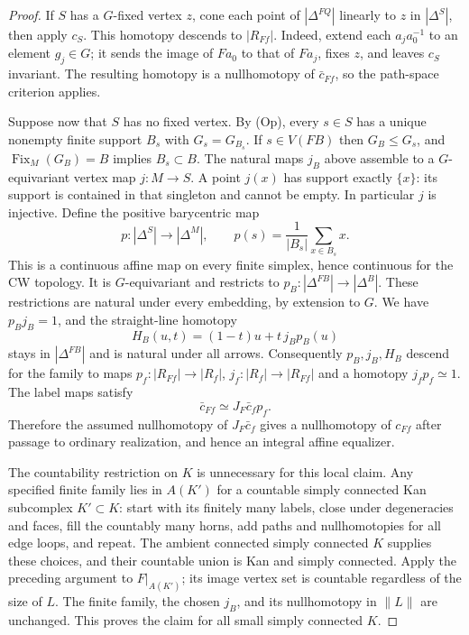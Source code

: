 \begin{proof}
If $S$ has a $G$-fixed vertex $z$, cone each point of
$|\Delta^{FQ}|$ linearly to $z$ in $|\Delta^S|$, then apply $c_S$.
This homotopy descends to $|R_{Ff}|$. Indeed, extend each
$a_j a_0^{-1}$ to an element $g_j\in G$; it sends the image of
$F a_0$ to that of $F a_j$, fixes $z$, and leaves $c_S$ invariant.
The resulting homotopy is a nullhomotopy of $\bar c_{Ff}$, so the
path-space criterion applies.

Suppose now that $S$ has no fixed vertex. By (Op), every $s\in S$
has a unique nonempty finite support $B_s$ with
$G_s=G_{B_s}$. If $s\in V(FB)$ then $G_B\leq G_s$, and
$\operatorname{Fix}_M(G_B)=B$ implies $B_s\subset B$.
The natural maps $j_B$ above assemble to a $G$-equivariant vertex
map $j:M\to S$. A point $j(x)$ has support exactly $\{x\}$:
its support is contained in that singleton and cannot be empty.
In particular $j$ is injective. Define the positive barycentric map
\[
 p:|\Delta^S|\longrightarrow|\Delta^M|,
 \qquad p(s)=\frac1{|B_s|}\sum_{x\in B_s}x.
 \tag{KC.4}
\]
This is a continuous affine map on every finite simplex, hence
continuous for the CW topology. It is $G$-equivariant and restricts
to $p_B:|\Delta^{FB}|\to|\Delta^B|$. These restrictions are natural
under every embedding, by extension to $G$. We have $p_Bj_B=1$,
and the straight-line homotopy
\[
 H_B(u,t)=(1-t)u+t\,j_Bp_B(u)
 \tag{KC.5}
\]
stays in $|\Delta^{FB}|$ and is natural under all arrows.
Consequently $p_B,j_B,H_B$ descend for the family to maps
$p_f:|R_{Ff}|\to|R_f|$, $j_f:|R_f|\to|R_{Ff}|$ and a homotopy
$j_fp_f\simeq1$. The label maps satisfy
\[
 \bar c_{Ff}\simeq J_F\bar c_f p_f.
 \tag{KC.6}
\]
Therefore the assumed nullhomotopy of $J_F\bar c_f$ gives a
nullhomotopy of $c_{Ff}$ after passage to ordinary realization,
and hence an integral affine equalizer.

The countability restriction on $K$ is unnecessary for this local
claim. Any specified finite family lies in $A(K')$ for a countable
simply connected Kan subcomplex $K'\subset K$: start with its
finitely many labels, close under degeneracies and faces, fill the
countably many horns, add paths and nullhomotopies for all edge
loops, and repeat. The ambient connected simply connected $K$
supplies these choices, and their countable union is Kan and simply
connected. Apply the preceding argument to $F|_{A(K')}$; its image
vertex set is countable regardless of the size of $L$. The finite
family, the chosen $j_B$, and its nullhomotopy in $\|L\|$ are
unchanged. This proves the claim for all small simply connected $K$.


\end{proof}

